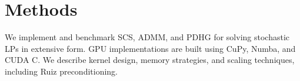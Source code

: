 \section{Methods}
We implement and benchmark SCS, ADMM, and PDHG for solving stochastic LPs in extensive form. GPU implementations are built using CuPy, Numba, and CUDA C. We describe kernel design, memory strategies, and scaling techniques, including Ruiz preconditioning.